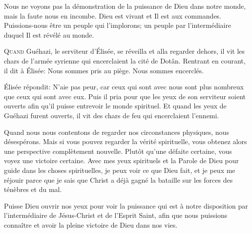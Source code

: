 Nous ne voyons pas la démonstration de la puissance de Dieu dans notre monde,
 mais la faute nous en incombe. Dieu est vivant et Il est aux commandes.
 Puissions-nous être un peuple qui l'implorons; un peuple par l'intermédiaire
 duquel Il est révélé au monde. 

\dvrule






\lettrine{Q}{uand} Guéhazi, le serviteur d'Élisée, se réveilla
 et alla regarder dehors, il vit les chars de l'armée syrienne
 qui encerclaient la cité de Dotân.
 Rentrant en courant, il dit à Élisée:
 \Og Nous sommes pris au piège. Nous sommes encerclés. \Fg{}

Élisée répondit:
 \Og N'aie pas peur, car ceux qui sont avec nous sont plus nombreux
 que ceux qui sont avec eux. \Fg{}
 Puis il pria pour que les yeux de son serviteur soient ouverts
 afin qu'il puisse entrevoir le monde spirituel.
 Et quand les yeux de Guéhazi furent ouverts,
 il vit des chars de feu qui encerclaient l'ennemi. 


Quand nous nous contentons de regarder nos circonstances physiques,
 nous désespérons. Mais si vous pouvez regarder la vérité spirituelle,
 vous obtenez alors une perspective complètement nouvelle.
 Plutôt qu'une défaite certaine, vous voyez une victoire certaine.
 Avec mes yeux spirituels et la Parole de Dieu pour guide
 dans les choses spirituelles, je peux voir ce que Dieu fait,
 et je peux me réjouir parce que je sais que Christ a déjà gagné
 la bataille sur les forces des ténèbres et du mal. 

Puisse Dieu ouvrir nos yeux pour voir la puissance qui est à notre
 disposition par l'intermédiaire de Jésus-Christ et de l'Esprit Saint, 
 afin que nous puissions connaître et avoir la pleine victoire de Dieu
 dans nos vies. 


